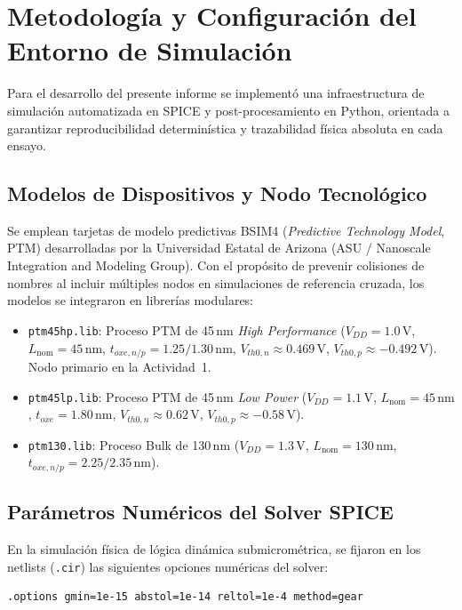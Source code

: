 \section{Metodología y Configuración del Entorno de Simulación}
\label{sec:metodologia}

Para el desarrollo del presente informe se implementó una infraestructura de simulación automatizada en SPICE y post-procesamiento en Python, orientada a garantizar reproducibilidad determinística y trazabilidad física absoluta en cada ensayo.

\subsection{Modelos de Dispositivos y Nodo Tecnológico}
Se emplean tarjetas de modelo predictivas BSIM4 (\textit{Predictive Technology Model}, PTM) desarrolladas por la Universidad Estatal de Arizona (ASU / Nanoscale Integration and Modeling Group). Con el propósito de prevenir colisiones de nombres al incluir múltiples nodos en simulaciones de referencia cruzada, los modelos se integraron en librerías modulares:
\begin{itemize}[leftmargin=1.4em,itemsep=0.1em]
  \item \texttt{ptm45hp.lib}: Proceso PTM de 45\,nm \textit{High Performance} ($V_{DD} = 1.0\,\text{V}$, $L_{\text{nom}} = 45\,\text{nm}$, $t_{oxe,n/p} = 1.25/1.30\,\text{nm}$, $V_{th0,n} \approx 0.469\,\text{V}$, $V_{th0,p} \approx -0.492\,\text{V}$). Nodo primario en la Actividad~1.
  \item \texttt{ptm45lp.lib}: Proceso PTM de 45\,nm \textit{Low Power} ($V_{DD} = 1.1\,\text{V}$, $L_{\text{nom}} = 45\,\text{nm}$, $t_{oxe} = 1.80\,\text{nm}$, $V_{th0,n} \approx 0.62\,\text{V}$, $V_{th0,p} \approx -0.58\,\text{V}$).
  \item \texttt{ptm130.lib}: Proceso Bulk de 130\,nm ($V_{DD} = 1.3\,\text{V}$, $L_{\text{nom}} = 130\,\text{nm}$, $t_{oxe,n/p} = 2.25/2.35\,\text{nm}$).
\end{itemize}

\subsection{Parámetros Numéricos del Solver SPICE}
En la simulación física de lógica dinámica submicrométrica, se fijaron en los netlists (\texttt{.cir}) las siguientes opciones numéricas del solver:
\begin{lstlisting}[style=spice]
.options gmin=1e-15 abstol=1e-14 reltol=1e-4 method=gear
\end{lstlisting}

